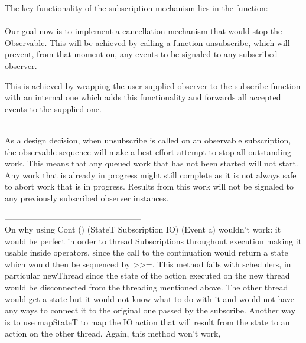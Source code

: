 The key functionality of the subscription mechanism lies in the  function:\\

\\

Our goal now is to implement a cancellation mechanism that would stop the Observable. This will be achieved by calling a function unsubscribe, which will prevent, from that moment on, any events to be signaled to any subscribed observer.

This is achieved by wrapping the user supplied observer to the subscribe function with an internal one which adds this functionality and forwards all accepted events to the supplied one.

\\

As a design decision, when unsubscribe is called on an observable subscription, the observable sequence will make a best effort attempt to stop all outstanding work. This means that any queued work that has not been started will not start. Any work that is already in progress might still complete as it is not always safe to abort work that is in progress. Results from this work will not be signaled to any previously subscribed observer instances.



--------------------------------------------------\\
On why using Cont () (StateT Subscription IO) (Event a) wouldn't work: it would be perfect in order to thread Subscriptions throughout execution making it usable inside operators, since the call to the continuation would return a state which would then be sequenced by >>=. This method fails with schedulers, in particular newThread since the state of the action executed on the new thread would be disconnected from the threading mentioned above. The other thread would get a state but it would not know what to do with it and would not have any ways to connect it to the original one passed by the subscribe. Another way is to use mapStateT to map the IO action that will result from the state to an action on the other thread. Again, this method won't work, 

